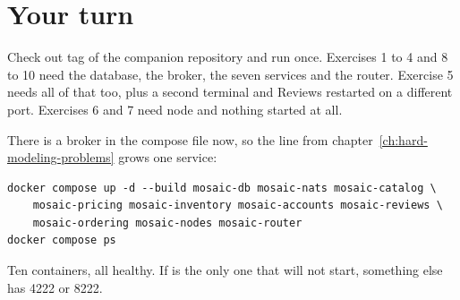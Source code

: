 \section*{Your turn}

Check out tag  of the companion repository and run 
once. Exercises 1 to 4 and 8 to 10 need the database, the broker, the seven
services and the router. Exercise 5 needs all of that too, plus a second
terminal and Reviews restarted on a different port. Exercises 6 and 7 need node
and nothing started at all.

There is a broker in the compose file now, so the line from
chapter~\ref{ch:hard-modeling-problems} grows one service:

\begin{verbatim}
docker compose up -d --build mosaic-db mosaic-nats mosaic-catalog \
    mosaic-pricing mosaic-inventory mosaic-accounts mosaic-reviews \
    mosaic-ordering mosaic-nodes mosaic-router
docker compose ps
\end{verbatim}

Ten containers, all healthy. If  is the only one that will not
start, something else has 4222 or 8222.

